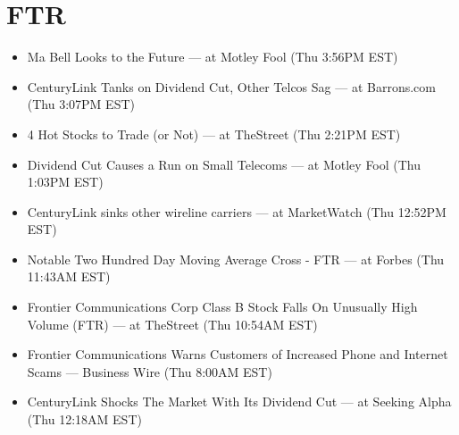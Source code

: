\documentclass[11pt,asymmetric]{article}
\begin{document}
\section*{FTR}
\begin{itemize}
\item Ma Bell Looks to the Future --- at Motley Fool (Thu 3:56PM EST)
\item CenturyLink Tanks on Dividend Cut, Other Telcos Sag --- at Barrons.com (Thu 3:07PM EST)
\item 4 Hot Stocks to Trade (or Not) --- at TheStreet (Thu 2:21PM EST)
\item Dividend Cut Causes a Run on Small Telecoms --- at Motley Fool (Thu 1:03PM EST)
\item CenturyLink sinks other wireline carriers --- at MarketWatch (Thu 12:52PM EST)
\item Notable Two Hundred Day Moving Average Cross - FTR --- at Forbes (Thu 11:43AM EST)
\item Frontier Communications Corp Class B Stock Falls On Unusually High Volume (FTR) --- at TheStreet (Thu 10:54AM EST)
\item Frontier Communications Warns Customers of Increased Phone and Internet Scams --- Business Wire (Thu 8:00AM EST)
\item CenturyLink Shocks The Market With Its Dividend Cut --- at Seeking Alpha (Thu 12:18AM EST)
\end{itemize}
\end{document}
